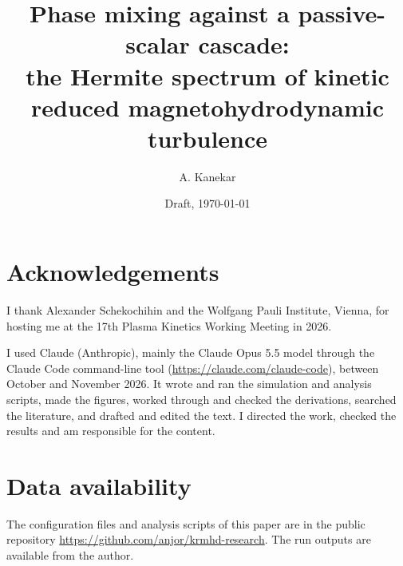 \documentclass[11pt]{article}
\title{Phase mixing against a passive-scalar cascade:\\ the Hermite spectrum of kinetic reduced magnetohydrodynamic turbulence}
\author{A. Kanekar}
\date{Draft, \today}
\begin{document}
\maketitle

\begin{abstract}

\end{abstract}








\section*{Acknowledgements}
I thank Alexander Schekochihin and the Wolfgang Pauli Institute, Vienna, for hosting me at the 17th Plasma Kinetics Working Meeting in 2026.

I used Claude (Anthropic), mainly the Claude Opus 5.5 model through the Claude Code command-line tool (\url{https://claude.com/claude-code}), between October and November 2026. It wrote and ran the simulation and analysis scripts, made the figures, worked through and checked the derivations, searched the literature, and drafted and edited the text. I directed the work, checked the results and am responsible for the content.

\section*{Data availability}
The configuration files and analysis scripts of this paper are in the public repository \url{https://github.com/anjor/krmhd-research}. The run outputs are available from the author.

\appendix
\renewcommand{\theequation}{\thesection\arabic{equation}}
\renewcommand{\theHequation}{\thesection.\arabic{equation}}




\renewcommand{\bibfont}{\small}
\setlength{\bibsep}{2pt}


\end{document}
